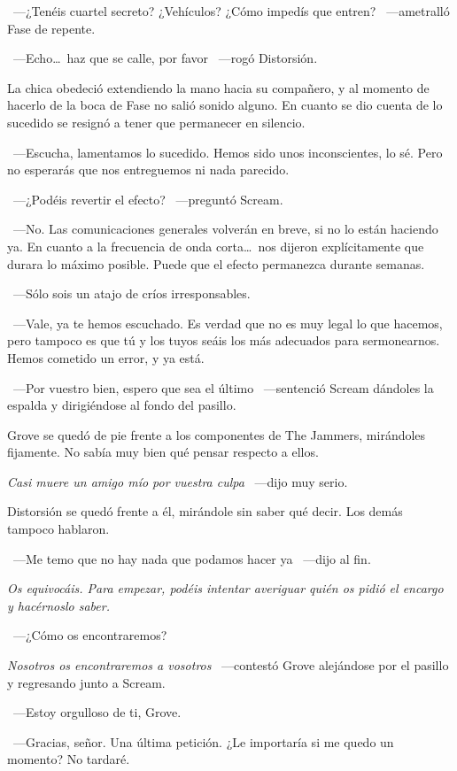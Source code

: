 ~---¿Tenéis cuartel secreto? ¿Vehículos? ¿Cómo impedís que entren? ~---ametralló Fase de repente.

~---Echo\dots\ haz que se calle, por favor ~---rogó Distorsión.

La chica obedeció extendiendo la mano hacia su compañero, y al momento de hacerlo de la boca de Fase no salió sonido alguno. En cuanto se dio cuenta de lo sucedido se resignó a tener que permanecer en silencio.

~---Escucha, lamentamos lo sucedido. Hemos sido unos inconscientes, lo sé. Pero no esperarás que nos entreguemos ni nada parecido.

~---¿Podéis revertir el efecto? ~---preguntó Scream.

~---No. Las comunicaciones generales volverán en breve, si no lo están haciendo ya. En cuanto a la frecuencia de onda corta\dots\ nos dijeron explícitamente que durara lo máximo posible. Puede que el efecto permanezca durante semanas.

~---Sólo sois un atajo de críos irresponsables.

~---Vale, ya te hemos escuchado. Es verdad que no es muy legal lo que hacemos, pero tampoco es que tú y los tuyos seáis los más adecuados para sermonearnos. Hemos cometido un error, y ya está.

~---Por vuestro bien, espero que sea el último ~---sentenció Scream dándoles la espalda y dirigiéndose al fondo del pasillo.

Grove se quedó de pie frente a los componentes de The Jammers, mirándoles fijamente. No sabía muy bien qué pensar respecto a ellos.

\emph{Casi muere un amigo mío por vuestra culpa} ~---dijo muy serio.

Distorsión se quedó frente a él, mirándole sin saber qué decir. Los demás tampoco hablaron.

~---Me temo que no hay nada que podamos hacer ya ~---dijo al fin.

\emph{Os equivocáis. Para empezar, podéis intentar averiguar quién os pidió el encargo y hacérnoslo saber.}

~---¿Cómo os encontraremos?

\emph{Nosotros os encontraremos a vosotros} ~---contestó Grove alejándose por el pasillo y regresando junto a Scream.

~---Estoy orgulloso de ti, Grove.

~---Gracias, señor. Una última petición. ¿Le importaría si me quedo un momento? No tardaré.

